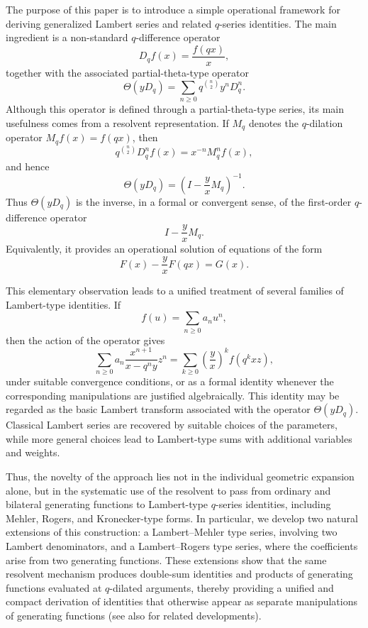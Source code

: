 \documentclass[12pt]{article}
\begin{document}
The purpose of this paper is to introduce a simple operational
framework for deriving generalized Lambert series and related
\(q\)-series identities. The main ingredient is a non-standard
\(q\)-difference operator
\[
   D_q f(x)=\frac{f(qx)}{x},
\]
together with the associated partial-theta-type operator
\[
   \Theta(yD_q)
   =
   \sum_{n\ge0} q^{\binom n2} y^n D_q^n.
\]
Although this operator is defined through a partial-theta-type series,
its main usefulness comes from a resolvent representation. If
\(M_q\) denotes the \(q\)-dilation operator \(M_qf(x)=f(qx)\), then
\[
   q^{\binom n2}D_q^n f(x)=x^{-n}M_q^n f(x),
\]
and hence
\[
   \Theta(yD_q)
   =
   \left(I-\frac{y}{x}M_q\right)^{-1}.
\]
Thus \(\Theta(yD_q)\) is the inverse, in a formal or convergent sense,
of the first-order \(q\)-difference operator
\[
   I-\frac{y}{x}M_q.
\]
Equivalently, it provides an operational solution of equations of the
form
\[
   F(x)-\frac{y}{x}F(qx)=G(x).
\]

This elementary observation leads to a unified treatment of several
families of Lambert-type identities. If
\[
   f(u)=\sum_{n\ge0}a_nu^n,
\]
then the action of the operator gives
\[
   \sum_{n\ge0}a_n
   \frac{x^{n+1}}{x-q^ny}z^n
   =
   \sum_{k\ge0}
   \left(\frac{y}{x}\right)^k f(q^kxz),
\]
under suitable convergence conditions, or as a formal identity whenever
the corresponding manipulations are justified algebraically. This
identity may be regarded as the basic Lambert transform associated with the operator \(\Theta(yD_q)\). Classical Lambert series are recovered by suitable choices of the parameters, while more general choices lead to Lambert-type sums with additional variables and weights.

Thus, the novelty of the approach lies not in the individual geometric expansion alone, but in the systematic use of the resolvent to pass from ordinary and bilateral generating functions to Lambert-type $q$-series identities, including Mehler, Rogers, and Kronecker-type forms. In particular, we develop two natural extensions of this construction: a Lambert–Mehler type series, involving two Lambert denominators, and a Lambert–Rogers type series, where the coefficients arise from two generating functions. These extensions show that the same resolvent mechanism produces double-sum identities and products of generating functions evaluated at $q$-dilated arguments, thereby providing a unified and compact derivation of identities that otherwise appear as separate manipulations of generating functions (see also \cite{Schmidt2020,AmdeberhanAndrewsBallantine} for related developments).
\end{document}
